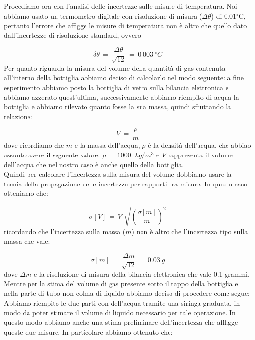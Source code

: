 Procediamo ora con l'analisi delle incertezze sulle misure di temperatura. Noi abbiamo usato un termometro digitale con risoluzione di misura ($\Delta \theta$) di 0.01$^\circ$C, pertanto l'errore che afflgge le misure di temperatura non è altro che quello dato dall'incertezze di risoluzione standard, ovvero:

\begin{equation*}
	\delta \theta \,=\, \frac{\Delta \theta}{\sqrt{12}} \,=\, \SI{0.003}{^\circ C}
\end{equation*}
%
Per quanto riguarda la misura del volume della quantità di gas contenuta all'interno della bottiglia abbiamo deciso di calcolarlo nel modo seguente: a fine esperimento abbiamo posto la bottiglia di vetro sulla bilancia elettronica e abbiamo azzerato quest'ultima, successivamente abbiamo riempito di acqua la bottiglia e abbiamo rilevato quanto fosse la sua massa, quindi sfruttando la relazione:

\begin{equation*}
	V \,=\, \frac{\rho}{m}  
\end{equation*}
%
dove ricordiamo che $m$ e la massa dell'acqua, $\rho$ è la densità dell'acqua, che abbiao assunto avere il seguente valore: $\rho \,=\, \SI{1000}{\,\,kg/m^3}$ e $V$ rappresenta il volume dell'acqua che nel nostro caso è anche quello della bottiglia.\\
Quindi per calcolare l'incertezza sulla misura del volume dobbiamo usare la tecnia della propagazione delle incertezze per rapporti tra misure. In questo caso otteniamo che:

\begin{equation*}
	\sigma [V] \,=\, V \,\, \sqrt{\left(\frac{\sigma [m]}{m}\right)^2}  
\end{equation*}
%
ricordando che l'incertezza sulla massa ($m$) non è altro che l'incertezza tipo sulla massa che vale:

\begin{equation*}
	\sigma [m] \,=\, \frac{\Delta m}{\sqrt{12}} \,=\, \SI{0.03}{g}
\end{equation*}
%
dove $\Delta m$ e la risoluzione di misura della bilancia elettronica che vale 0.1 grammi.\\
Mentre per la stima del volume di gas presente sotto il tappo della bottiglia e nella parte di tubo non colma di liquido abbiamo deciso di procedere come segue: Abbiamo riempito le due parti con dell'acqua tramite una siringa graduata, in modo da poter stimare il volume di liquido necessario per tale operazione. In questo modo abbiamo anche una stima preliminare dell'incertezza che affligge queste due misure. In particolare abbiamo ottenuto che:

